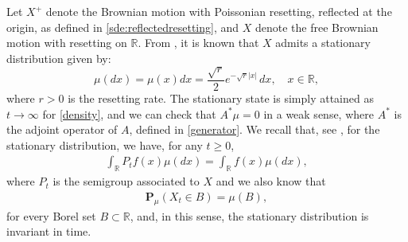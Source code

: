 \documentclass[11pt,a4paper]{article}
\theoremstyle{definition}
\theoremstyle{remark}
\begin{document}
Let \( X^+ \) denote the Brownian motion with Poissonian resetting, reflected at the origin, as defined in \eqref{sde:reflectedresetting}, and \( X \) denote the free Brownian motion with resetting on \(\mathbb{R}\). From \cite[Formula (2.18)]{evansreview}, it is known that \( X \) admits a stationary distribution given by:
\[
\mu(dx) = \mu(x) dx=\frac{\sqrt{r}}{2} e^{-\sqrt{r} \vert x \vert} \, dx, \quad x \in \mathbb{R},
\]
where \( r > 0 \) is the resetting rate. The stationary state  is simply attained as $t \to \infty$ for \eqref{density}, and we can check that $A^* \mu =0$ in a weak sense, where $A^*$ is the adjoint operator of $A$, defined in \eqref{generator}. We recall that, see \cite[Proposition 9.2]{markov-book}, for the stationary distribution, we have, for any \(t \geq 0\),
\begin{align*}
	\int_{\mathbb{R}} P_t f(x) \mu(dx)= \int_{\mathbb{R}} f(x) \mu(dx),
\end{align*}
where $P_t$ is the semigroup associated to $X$ and we also know that
\begin{align*}
	\mathbf{P}_\mu(X_t \in B)=\mu(B),
\end{align*}
for every Borel set $B \subset \mathbb{R}$, and, in this sense, the stationary distribution is invariant in time.
\end{document}
